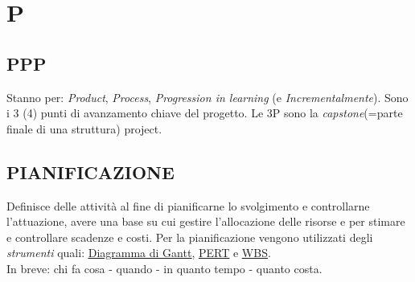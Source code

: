 \newpage
	\section{P} \label{sec:P}

		\subsection{PPP}		\label{3p}
		Stanno per: \textit{Product}, \textit{Process}, \textit{Progression in learning} (e \textit{Incrementalmente}). Sono i 3 (4) punti di avanzamento chiave del progetto. Le 3P sono la \textit{capstone}(=parte finale di una struttura) project.


		\subsection{PIANIFICAZIONE}  \label{pianificazione}
		Definisce delle attività al fine di pianificarne lo svolgimento e controllarne l’attuazione, avere una base su cui gestire l’allocazione delle risorse e per stimare e controllare scadenze e costi. Per la pianificazione vengono utilizzati degli \textit{strumenti} quali: \underline{\hyperref[gantt]{Diagramma di Gantt}}, \underline{\hyperref[pert]{PERT}} e \underline{\hyperref[wbs]{WBS}}. \\
		In breve: chi fa cosa - quando - in quanto tempo - quanto costa.


